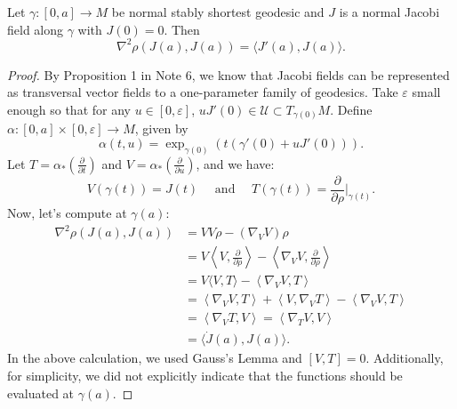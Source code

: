 \documentclass{ctexart}
\begin{document}
\begin{lemma}
  Let $\gamma:[0,a]\rightarrow M$ be normal stably shortest geodesic and $J$ is a normal Jacobi field along $\gamma$ with $J(0)=0$. Then 
  $$
  \nabla^2\rho\left(J\left(a\right),J\left(a\right)\right) = \langle J'\left(a\right),J\left(a\right)\rangle. 
  $$
\end{lemma}
\begin{proof}[Proof]
  By Proposition 1 in Note 6, we know that Jacobi fields can be represented as transversal vector fields to a one-parameter family of geodesics. 
  Take $\varepsilon$ small enough so that for any $u\in [0,\varepsilon]$, $u J'(0)\in \mathcal{U}\subset T_{\gamma(0)} M$. 
  Define $\alpha : [0, a] \times [0, \varepsilon] \rightarrow M$, given by
  $$
  \alpha(t, u) =\exp_{\gamma(0)}\left(t\left(\gamma'(0)+uJ'(0)\right)\right).
  $$
  Let $T = \alpha_*\left(\frac{\partial}{\partial t}\right)$ and $V = \alpha_*\left(\frac{\partial}{\partial u}\right)$, and we have:
  $$
  V(\gamma(t)) = J(t) \quad \text{ and } \quad T(\gamma(t)) = \frac{\partial}{\partial \rho}\big|_{\gamma(t)}.
  $$
  Now, let's compute at $\gamma(a)$: 
  $$
  \begin{aligned}
  \nabla^2 \rho(J(a), J(a)) &= V V \rho - \left(\nabla_V V\right) \rho \\
  &= V\left\langle V, \frac{\partial}{\partial \rho}\right\rangle - \left\langle\nabla_V V, \frac{\partial}{\partial \rho}\right\rangle \\
  &= V\langle V, T\rangle - \left\langle\nabla_V V, T\right\rangle \\
  &= \left\langle\nabla_V V, T\right\rangle + \left\langle V, \nabla_V T\right\rangle - \left\langle\nabla_V V, T\right\rangle \\
  &= \left\langle\nabla_V T, V\right\rangle = \left\langle\nabla_T V, V\right\rangle  \\
  &= \langle\dot{J}(a), J(a)\rangle.
  \end{aligned}
  $$
  In the above calculation, we used Gauss's Lemma and $ [V, T] = 0$. Additionally, for simplicity, we did not explicitly indicate that the functions should be evaluated at $\gamma(a)$.
\end{proof}
\end{document}
